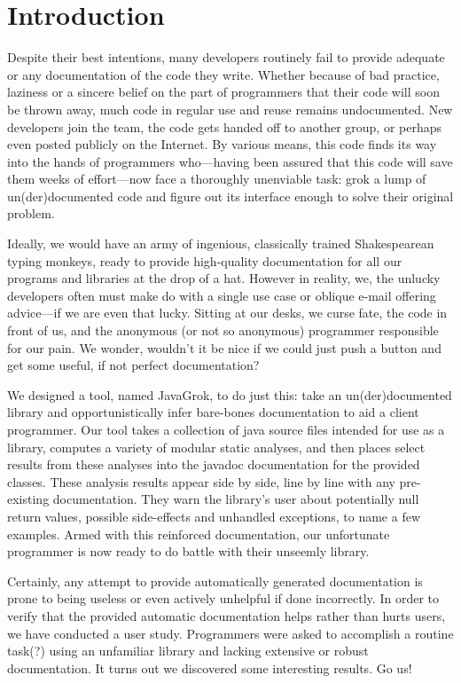 \section{Introduction}

Despite their best intentions, many developers routinely fail to provide
adequate or any documentation of the code they write.  Whether because of bad
practice, laziness or a sincere belief on the part of programmers that their
code will soon be thrown away, much code in regular use and reuse remains
undocumented.  New developers join the team, the code gets handed off to
another group, or perhaps even posted publicly on the Internet.  By various
means, this code finds its way into the hands of programmers who---having been
assured that this code will save them weeks of effort---now face a thoroughly
unenviable task: grok a lump of un(der)documented code and figure out its
interface enough to solve their original problem.

Ideally, we would have an army of ingenious, classically trained Shakespearean
typing monkeys, ready to provide high-quality documentation for all our
programs and libraries at the drop of a hat.  However in reality, we, the
unlucky developers often must make do with a single use case or oblique e-mail
offering advice---if we are even that lucky.  Sitting at our desks, we curse
fate, the code in front of us, and the anonymous (or not so anonymous)
programmer responsible for our pain.  We wonder, wouldn't it be nice if we
could just push a button and get some useful, if not perfect documentation?

We designed a tool, named JavaGrok, to do just this: take an un(der)documented
library and opportunistically infer bare-bones documentation to aid a client
programmer.  Our tool takes a collection of java source files intended for use
as a library, computes a variety of modular static analyses, and then places
select results from these analyses into the javadoc documentation for the
provided classes.  These analysis results appear side by side, line by line
with any pre-existing documentation.  They warn the library's user about
potentially null return values, possible side-effects and unhandled exceptions,
to name a few examples.  Armed with this reinforced documentation, our
unfortunate programmer is now ready to do battle with their unseemly library.

Certainly, any attempt to provide automatically generated documentation is
prone to being useless or even actively unhelpful if done incorrectly.  In
order to verify that the provided automatic documentation helps rather than
hurts users, we have conducted a user study.  Programmers were asked to
accomplish a routine task(?) using an unfamiliar library and lacking extensive
or robust documentation.  It turns out we discovered some interesting results.
Go us!
